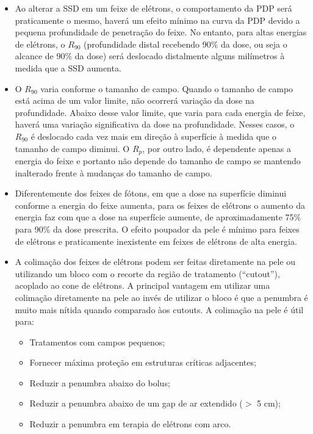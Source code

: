 \documentclass[11pt,a4paper]{article}
\newcounter{exemplo}
\begin{document}
\begin{exemplo}
\begin{itemize}
        \item Ao alterar a SSD em um feixe de elétrons, o comportamento da PDP será praticamente o mesmo, haverá um efeito mínimo na curva da PDP devido a pequena profundidade de penetração do feixe. No entanto, para altas energias de elétrons, o $R_{90}$ (profundidade distal recebendo 90\% da dose, ou seja o alcance de 90\% da dose) será deslocado distalmente alguns milímetros à medida que a SSD aumenta.
        
        \item O $R_{90}$ varia conforme o tamanho de campo. Quando o tamanho de campo está acima de um valor limite, não ocorrerá variação da dose na profundidade. Abaixo desse valor limite, que varia para cada energia de feixe, haverá uma variação significativa da dose na profundidade. Nesses casos, o $R_{90}$ é deslocado cada vez mais em direção à superfície à medida que o tamanho de campo diminui. O $R_p$, por outro lado, é dependente apenas a energia do feixe e portanto não depende do tamanho de campo se mantendo inalterado frente à mudanças do tamanho de campo.
    
        \item Diferentemente dos feixes de fótons, em que a dose na superfície diminui conforme a energia do feixe aumenta, para os feixes de elétrons o aumento da energia faz com que a dose na superfície aumente, de aproximadamente 75\% para 90\% da dose prescrita. O efeito poupador da pele é mínimo para feixes de elétrons e praticamente inexistente em feixes de elétrons de alta energia. 

        \item A colimação dos feixes de elétrons podem ser feitas diretamente na pele ou utilizando um bloco com o recorte da região de tratamento (``cutout''), acoplado ao cone de elétrons. A principal vantagem em utilizar uma colimação diretamente na pele ao invés de utilizar o bloco é que a penumbra é muito mais nítida quando comparado àos cutouts. A colimação na pele é útil para:
        
            \begin{itemize}[label=\textcolor{CarnationPink}{\textopenbullet}]
                \item Tratamentos com campos pequenos;
                \item Fornecer máxima proteção em estruturas críticas adjacentes;
                \item Reduzir a penumbra abaixo do bolus;
                \item Reduzir a penumbra abaixo de um gap de ar extendido ($>$ 5 cm);
                \item Reduzir a penumbra em terapia de elétrons com arco. 
            \end{itemize}
        

\end{itemize}
\end{exemplo}
\end{document}
